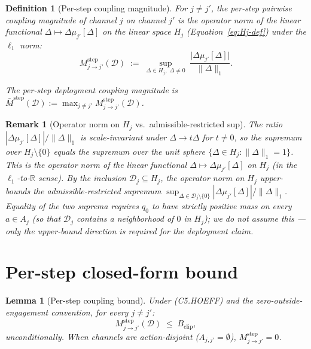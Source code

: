 \documentclass{article}
\newtheorem{definition}{Definition}
\newtheorem{lemma}{Lemma}
\newtheorem{remark}{Remark}
\newcommand{\Bclip}{B_{\mathrm{clip}}}
\begin{document}
\begin{definition}[Per-step coupling magnitude]
\label{def:M-step-v3}
For $j \neq j'$, the \emph{per-step pairwise coupling magnitude}
of channel $j$ on channel $j'$ is the operator norm of the linear
functional $\Delta \mapsto \Delta\mu_{j'}[\Delta]$ on the linear
space $H_j$ (Equation~\eqref{eq:Hj-def}) under the $\ell_1$ norm:
\begin{equation}
\label{eq:M-step-def-v3}
  M_{j \to j'}^{\mathrm{step}}(\mathcal{D})
  \;:=\; \sup_{\Delta \in H_j,\; \Delta \neq 0}
  \;\frac{\big| \Delta\mu_{j'}[\Delta] \big|}{\|\Delta\|_1}.
\end{equation}

The \emph{per-step deployment coupling magnitude} is
$\bar{M}^{\mathrm{step}}(\mathcal{D}) := \max_{j \neq j'}
M_{j \to j'}^{\mathrm{step}}(\mathcal{D})$.
\end{definition}

\begin{remark}[Operator norm on $H_j$ vs.\ admissible-restricted sup]
\label{rem:operator-norm}
The ratio $|\Delta\mu_{j'}[\Delta]| / \|\Delta\|_1$ is scale-invariant
under $\Delta \to t\Delta$ for $t \neq 0$, so the supremum over
$H_j \setminus \{0\}$ equals the supremum over the unit sphere
$\{\Delta \in H_j : \|\Delta\|_1 = 1\}$.  This is the operator
norm of the linear functional $\Delta \mapsto \Delta\mu_{j'}[\Delta]$
on $H_j$ (in the $\ell_1$-to-$\mathbb{R}$ sense).  By the
inclusion $\mathcal{D}_j \subseteq H_j$, the operator norm on
$H_j$ upper-bounds the admissible-restricted supremum
$\sup_{\Delta \in \mathcal{D}_j \setminus \{0\}}
|\Delta\mu_{j'}[\Delta]|/\|\Delta\|_1$.  Equality of the two
suprema requires $q_0$ to have strictly positive mass on every
$a \in A_j$ (so that $\mathcal{D}_j$ contains a neighborhood of
$0$ in $H_j$); we do not assume this --- only the upper-bound
direction is required for the deployment claim.
\end{remark}

\section{Per-step closed-form bound}

\begin{lemma}[Per-step coupling bound]
\label{lem:per-step-v3}
Under (C5.HOEFF) and the zero-outside-engagement convention, for
every $j \neq j'$:
\begin{equation}
\label{eq:per-step-bound-v3}
  M_{j \to j'}^{\mathrm{step}}(\mathcal{D}) \;\leq\; \Bclip,
\end{equation}
unconditionally.  When channels are action-disjoint
($A_{j, j'} = \emptyset$), $M_{j \to j'}^{\mathrm{step}} = 0$.
\end{lemma}
\end{document}
